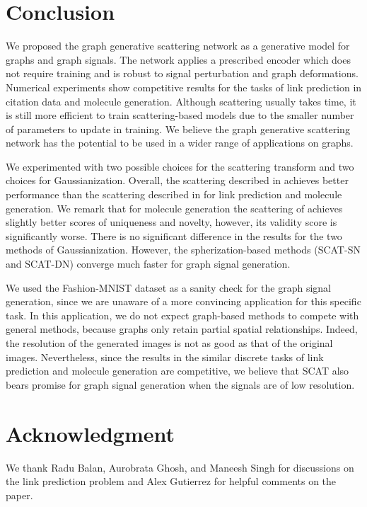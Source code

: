 \documentclass[conference]{IEEEtran}
\begin{document}
\section{Conclusion}

We proposed the graph generative scattering network as a generative model for graphs and graph signals. The network applies a prescribed encoder which does not require training and is robust to signal perturbation and graph deformations. Numerical experiments show competitive results for the tasks of link prediction in citation data and molecule generation. Although scattering usually takes time, it is still more efficient to train scattering-based models due to the smaller number of parameters to update in training.
We believe the graph generative scattering network has the potential to be used in a wider range of applications on graphs.

We experimented with two possible choices for the scattering transform and two choices for Gaussianization. Overall, the scattering described in \cite{zou2018graph} achieves better performance than the scattering described in \cite{gama2018diffusion} for link prediction and molecule generation. We remark that for molecule generation the scattering of \cite{gama2018diffusion} achieves slightly better scores of uniqueness and novelty, however, its validity score is significantly worse. There is no significant difference in the results for the two methods of Gaussianization. However, the spherization-based methods (SCAT-SN and SCAT-DN) converge much faster for graph signal generation.

We used the Fashion-MNIST dataset as a sanity check for the graph signal generation, since we are unaware of a more convincing application for this specific task. In this application, we do not expect graph-based methods to compete with general methods, because graphs only retain partial spatial relationships. Indeed, the resolution of the generated images is not as good as that of the original images. Nevertheless, since the results in the similar discrete tasks of link prediction and molecule generation are competitive, we believe that SCAT also bears promise for graph signal generation when the signals are of low resolution. 



\section*{Acknowledgment}
We thank Radu Balan, Aurobrata
Ghosh, and Maneesh Singh for discussions on the link prediction problem and Alex Gutierrez for helpful
comments on the paper.






\end{document}
